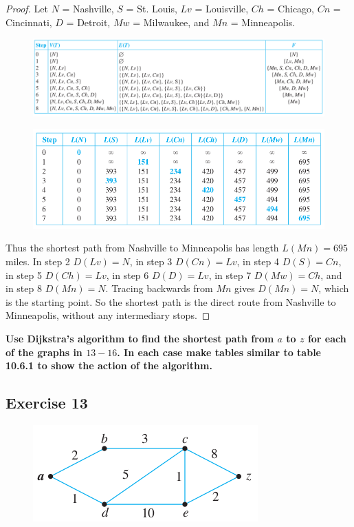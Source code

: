 \documentclass[14pt]{extarticle}
\newcommand{\cy}{\color{cyan}}
\begin{document}
\begin{proof}
Let \(N\) = Nashville, \(S\) = St. Louis, \(Lv\) = Louisville, \(Ch\) = Chicago, \(Cn\) = Cincinnati, \(D\) = Detroit, \(Mw\) 
= Milwaukee, and \(Mn\) = Minneapolis.

\begin{figure}[ht!]
\centering
\includegraphics[scale=0.45]{../images/10.6.12.2.png}
\end{figure}

\begin{figure}[ht!]
\centering
\includegraphics[scale=0.5]{../images/10.6.12.3.png}
\end{figure}

Thus the shortest path from Nashville to Minneapolis has length \(L(Mn) = 695\) miles. In step 2 \(D(Lv) = N\), in step 
3 \(D(Cn) = Lv\), in step 4 \(D(S) = Cn\), in step 5 \(D(Ch) = Lv\), in step 6 \(D(D) = Lv\), in step 7 \(D(Mw) = Ch\), and 
in step 8 \(D(Mn) = N\). Tracing backwards from \(Mn\) gives \(D(Mn) = N\), which is the starting point. So the shortest 
path is the direct route from Nashville to Minneapolis, without any intermediary stops.
\end{proof}

{\bf \cy Use Dijkstra’s algorithm to find the shortest path from \(a\) to \(z\) for each of the graphs in \(13-16\). In 
each case make tables similar to table 10.6.1 to show the action of the algorithm.}

\subsection{Exercise 13}
\begin{figure}[ht!]
\centering
\includegraphics[scale=0.6]{../images/10.6.13.png}
\end{figure}
\end{document}
